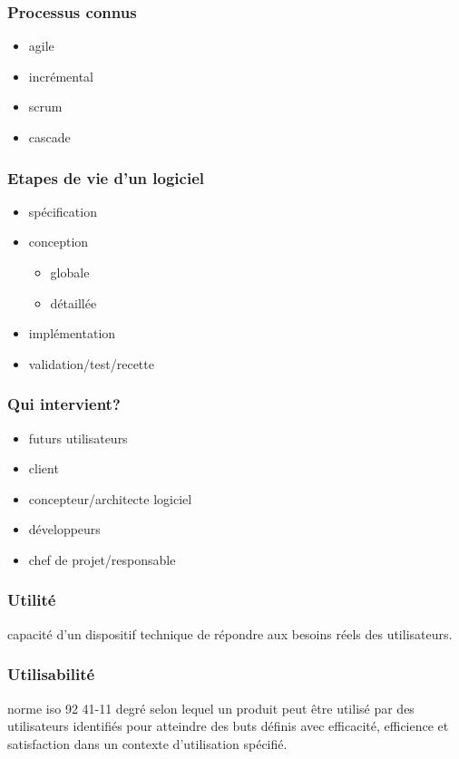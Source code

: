 \documentclass{article}
\begin{document}
\subsubsection{Processus connus}
\begin{itemize}
	\item agile
	\item incrémental
	\item scrum
	\item cascade
\end{itemize}

\subsubsection{Etapes de vie d'un logiciel}
\begin{itemize}
	\item spécification
	\item conception
	\begin{itemize}
		\item globale
		\item détaillée
	\end{itemize}
	\item implémentation
	\item validation/test/recette
\end{itemize}

\subsubsection{Qui intervient?}
\begin{itemize}
	\item futurs utilisateurs
	\item client
	\item concepteur/architecte logiciel
	\item développeurs
	\item chef de projet/responsable
\end{itemize}

\subsubsection{Utilité}
capacité d'un dispositif technique de répondre aux besoins réels des utilisateurs.

\subsubsection{Utilisabilité}
norme iso 92 41-11
degré selon lequel un produit peut être utilisé par des utilisateurs identifiés pour atteindre des buts définis avec efficacité, efficience et satisfaction dans un contexte d'utilisation spécifié.
\end{document}
